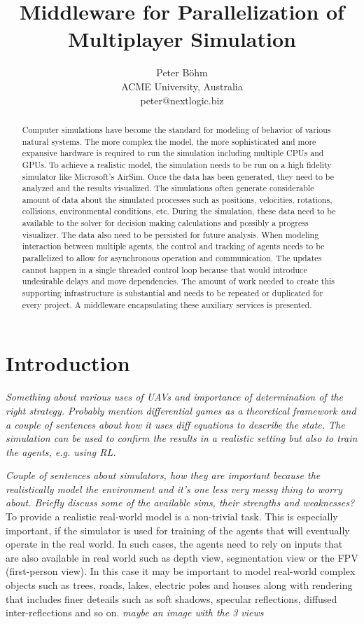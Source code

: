 \documentclass{article}
\title{Middleware for Parallelization of Multiplayer Simulation}
\author{Peter Böhm \\ ACME University, Australia \\ 
peter@nextlogic.biz}
\begin{document}
\maketitle

\begin{abstract}
Computer simulations have become the standard for modeling of behavior of various natural systems. The more complex the model, the more sophisticated and more expansive hardware is required to run the simulation including multiple CPUs and GPUs. To achieve a realistic model, the simulation needs to be run on a high fidelity simulator like Microsoft's AirSim. Once the data has been generated, they need to be analyzed and the results visualized. The simulations often generate considerable amount of data about the simulated processes such as positions, velocities, rotations, collisions, environmental conditions, etc. During the simulation, these data need to be available to the solver for decision making calculations and possibly a progress visualizer. The data also need to be persisted for future analysis. When modeling interaction between multiple agents, the control and tracking of agents needs to be parallelized to allow for asynchronous operation and communication. The updates cannot happen in a single threaded control loop because that would introduce undesirable delays and move dependencies. The amount of work needed to create this supporting infrastructure is substantial and needs to be repeated or duplicated for every project. A middleware encapsulating these auxiliary services is presented.
\end{abstract}

\section{Introduction}

\emph{Something about various uses of UAVs and importance of determination of the right strategy. Probably mention differential games as a theoretical framework and a couple of sentences about how it uses diff equations to describe the state. The simulation can be used to confirm the results in a realistic setting but also to train the agents, e.g. using RL. }

\emph{Couple of sentences about simulators, how they are important because the realistically model the environment and it's one less very messy thing to worry about. Briefly discuss some of the available sims, their strengths and weaknesses?}
To provide a realistic real-world model is a non-trivial task. This is especially important, if the simulator is used for training of the agents that will eventually operate in the real world. In such cases, the agents need to rely on inputs that are also available in real world such as depth view, segmentation view or the FPV (first-person view). In this case it may be important to model real-world complex objects such as trees, roads, lakes, electric poles and houses along with rendering that includes finer deteails such as soft shadows, specular reflections, diffused inter-reflections and so on. \cite{shah2018airsim}
\emph{maybe an image with the 3 views}
\end{document}
